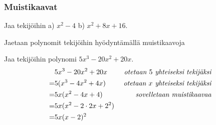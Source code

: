 \subsubsection*{Muistikaavat}

\begin{esimerkki}
Jaa tekijöihin \quad a) $x^2-4$ \quad b) $x^2+8x+16.$
	\begin{esimratk}
Jaetaan polynomit tekijöihin hyödyntämällä muistikaavoja
	\end{esimratk}
\end{esimerkki}

\begin{esimerkki}
Jaa tekijöihin polynomi $5x^3-20x^2+20x$.
\begin{align*}
& 5x^3-20x^2+20x \ \ \ \ &\emph{otetaan $5$ yhteiseksi tekijäksi}\\
=& 5(x^3-4x^2+4x)&\emph{otetaan $x$ yhteiseksi tekijäksi}  \\
=& 5x(x^2-4x+4) &\emph{sovelletaan muistikaavaa} \\
=& 5x(x^2-2\cdot 2x+2^2)  \\
=& 5x(x-2)^2
\end{align*}
\end{esimerkki}


